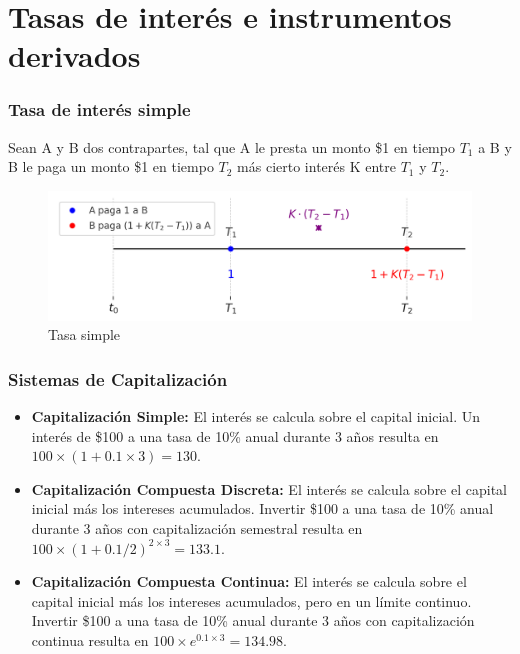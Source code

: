 \section{Tasas de interés e instrumentos derivados}


\begin{frame}
    \frametitle{Tasa de interés simple}
    Sean A y B dos contrapartes, tal que A le presta un monto \$1 en tiempo $T_1$ a B y B le paga un monto \$1 en tiempo $T_2$ más cierto interés K entre $T_1$ y $T_2$. 
    \begin{figure}[h]
       \centering
       \includegraphics[width=\textwidth]{img/cap1/accrual_simple.png}
       \caption{Tasa simple}
       \label{accrual_simple}
   \end{figure}
\end{frame}


\begin{frame}
    \frametitle{Sistemas de Capitalización}
    \begin{itemize}
        \item \textbf{Capitalización Simple:} El interés se calcula sobre el capital inicial. Un interés de \$100 a una tasa de 10\% anual durante 3 años resulta en $100 \times (1+0.1 \times 3) = 130$.
        \item \textbf{Capitalización Compuesta Discreta:} El interés se calcula sobre el capital inicial más los intereses acumulados. Invertir \$100 a una tasa de 10\% anual durante 3 años con capitalización semestral resulta en $100 \times (1+0.1/2)^{2 \times 3} = 133.1$.  
        \item \textbf{Capitalización Compuesta Continua:} El interés se calcula sobre el capital inicial más los intereses acumulados, pero en un límite continuo. Invertir \$100 a una tasa de 10\% anual durante 3 años con capitalización continua resulta en $100 \times e^{0.1 \times 3} = 134.98$. 
    \end{itemize}

\end{frame}

